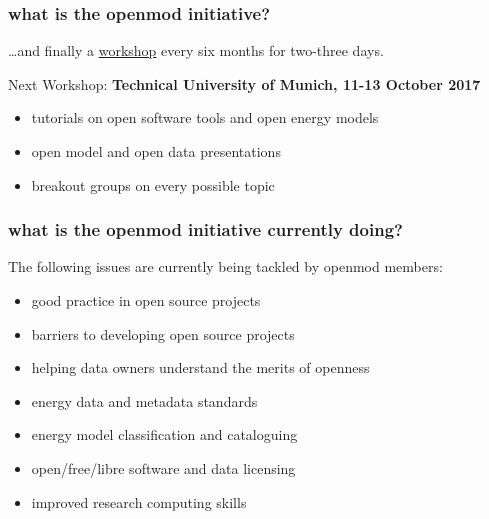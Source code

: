 \documentclass[12pt,aspectratio=169]{beamer}
\let\olditem\item
\renewcommand{\item}{%
\olditem\vspace{5pt}}
\begin{document}
\begin{frame}
  \frametitle{what is the openmod initiative?}

  \dots and finally a \alert{\href{https://wiki.openmod-initiative.org/wiki/Open_Energy_Modelling_Workshop_-_Munich_2017}{workshop}} every six months for two-three days.

  \vspace{.5cm}

  Next Workshop: {\bf Technical University of Munich, 11-13 October 2017}

  \begin{itemize}
  \item  tutorials on open software tools and open energy models
  \item open model and open data presentations
  \item breakout  groups on every possible topic
  \end{itemize}

\end{frame}


\begin{frame}
  \frametitle{what is the openmod initiative currently doing?}

  The following \alert{issues} are currently being tackled by
  openmod members:
  \begin{itemize}
  \item   good practice in open source projects
  \item barriers to developing open source projects
  \item helping data owners understand the merits of openness
  \item energy data and metadata standards
  \item energy model classification and cataloguing
  \item open/free/libre software and data licensing
  \item improved research computing skills
  \end{itemize}
\end{frame}
\end{document}
